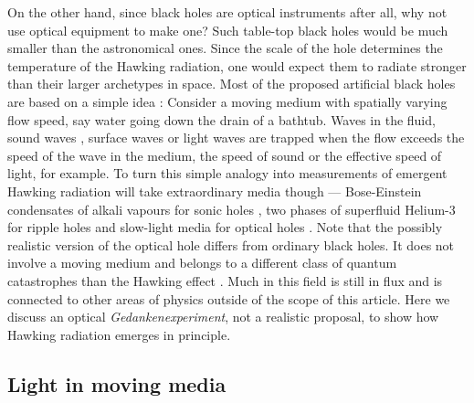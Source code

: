 \documentclass[12pt,amsmath,amssymb]{article}
\numberwithin{equation}{section}
\begin{document}
On the other hand, since black holes are optical instruments after all,
why not use optical equipment to make one?
Such table-top black holes would be much smaller than
the astronomical ones. Since the scale of the hole determines the
temperature of the Hawking radiation, one would expect them to
radiate stronger than their larger archetypes in space.
Most of the proposed artificial black holes \cite{Novello}
are based on a simple idea \cite{Unruh,Visser}:
Consider a moving medium with spatially varying flow speed, say
water going down the drain of a bathtub.
Waves in the fluid, sound waves \cite{Unruh,Visser},
surface waves \cite{Schuetzhold2} or light waves
\cite{Brevik,LeoPiwstor,Schuetzhold1} are trapped
when the flow exceeds the speed of the wave in the medium,
the speed of sound or the  effective speed of light, for example.
To turn this simple analogy into measurements of emergent
Hawking radiation will take extraordinary media though ---
Bose-Einstein condensates of alkali vapours
\cite{Dalfovo,PS} for sonic holes \cite{Garay,LKO},
two phases of superfluid Helium-3 \cite{VolovikBook}
for ripple holes \cite{Schuetzhold2} and slow-light media
\cite{LeoSlow,Lukin}
for optical holes \cite{LeoPiwliten,LeoNature,LeoCatastrophe}.
Note that the possibly realistic version of the optical hole
\cite{LeoNature,LeoCatastrophe}
differs from ordinary black holes.
It does not involve a moving medium and belongs
to a different class of quantum catastrophes \cite{LeoCatastrophe}
than the Hawking effect
\cite{Birrell,Brout,Hawking1,Hawking2}.
Much in this field is still in flux and is connected to other areas
of physics outside of the scope of this article.
Here we discuss an optical {\it Gedankenexperiment},
not a realistic proposal, to show how Hawking radiation
emerges in principle.

\subsection{Light in moving media}
\end{document}
